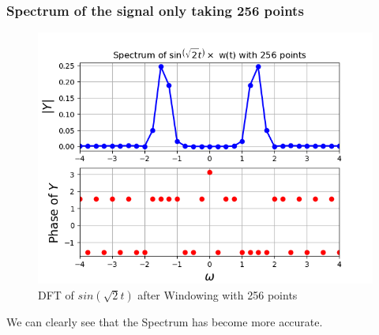 \documentclass[11pt]{article}
\begin{document}
\subsubsection{Spectrum of the signal only taking 256 points}
\begin{figure}[H]
    \centering
    \includegraphics[scale = 0.75]{Figure_5.png}
    \caption{DFT of $sin(\sqrt{2}t)$ after Windowing with 256 points}
\end{figure}
We can clearly see that the Spectrum has become more accurate.
\end{document}
